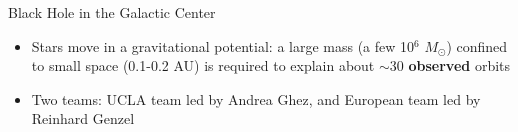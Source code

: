 \documentclass[letterpaper,landscape]{slides}
\begin{document}
\begin{slide}
{\begin{minipage}[t]{9cm}
\end{minipage}

\begin{minipage}[t]{15cm}
\begin{center}
\vskip -0.1in \hskip 0.04in
{\large \color{red} \phantom{} Black Hole in the Galactic Center }
\end{center}


\begin{itemize}
\item {\color{blue} Stars move} in a gravitational potential: {\color{blue} 
    a large mass (a few 10$^6$ $M_\odot$) confined to small space (0.1-0.2
    AU)} is required to explain about
    $\sim$30 {\bf observed} orbits
\item Two teams: UCLA team led by Andrea Ghez, and European team led by
   Reinhard Genzel 
\end{itemize}
\vskip 0.3in

\end{minipage}}
\vfill 
\end{slide}
\end{document}
